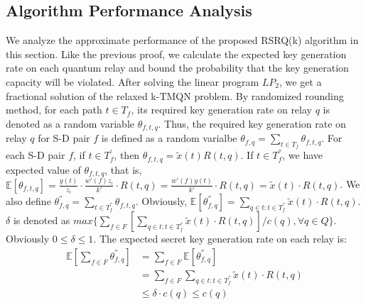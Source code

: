 {	
\subsection{Algorithm Performance Analysis}
We analyze the approximate performance of the proposed RSRQ(k) algorithm in this section. Like the previous proof, we calculate the expected key generation rate on each quantum relay and bound the probability that the key generation capacity will be violated. After solving the linear program $LP_2$, we get a fractional solution of the relaxed k-TMQN problem. By randomized rounding method, for each path $t \in T_f$, its required key generation rate on relay $q$ is denoted as a random variable $\theta_{f,t,q}$. Thus, the required key generation rate on relay $q$ for S-D pair $f$ is defined as a random varialbe $\theta_{f,q} = \sum_{t \in T_f}\theta_{f,t,q}$.
For each S-D pair $f$, if $t \in T^{'}_f$, then $\theta_{f,t,q} = \widetilde{x}(t)R(t,q)$. If $t \in T^{''}_f$, we have expected value of $\theta_{f,t,q}$, that is, $\mathbb{E}[\theta_{f,t,q}]= \frac{y(t)}{z_i} \cdot \frac{w'(f)z_i}{k'} \cdot R(t,q) = \frac{w'(f)y(t)}{k'} \cdot R(t,q) = \widetilde{x}(t) \cdot R(t,q)$. We also define $\theta^{''}_{f,q} = \sum_{t \in T^{''}_f}\theta_{f,t,q}$. Obviously, $\mathbb{E}[\theta^{''}_{f,q}]= \sum_{q \in t:t \in T^{''}_f}\widetilde{x}(t) \cdot R(t,q)$. $\delta$ is denoted as $max\{\sum_{f \in F}[\sum_{q \in t:t \in T^{''}_f}\widetilde{x}(t)\cdot R(t,q)]/c(q), \forall q \in Q\}$. Obviously $0 \le \delta \le 1$. The expected secret key generation rate on each relay is:
\begin{equation}
\begin{aligned}
	\mathbb{E}[\sum_{f \in F}\theta^{''}_{f,q}] &=  \sum_{f \in F} \mathbb{E}[\theta^{''}_{f,q}] \\
	&= \sum_{f \in F}\sum_{q \in t:t \in T^{''}_f}\widetilde{x}(t)\cdot R(t,q) \\
	& \le \delta \cdot c(q) \le c(q)
\end{aligned}
\end{equation} 

}
